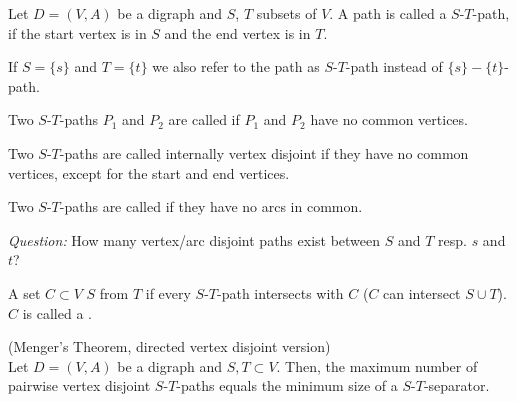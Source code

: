 \begin{lec}[2011-12-01]\end{lec}



\begin{defn}
Let $D = (V, A)$ be a digraph and $S$, $T$ subsets of $V$.
A path is called a $S$-$T$-path, if the start vertex is in $S$ and the end
vertex is in $T$.

If $S = \{s\}$ and $T = \{t\}$ we also refer to the path as $S$-$T$-path
instead of $\{s\}-\{t\}$-path.
\end{defn}

\begin{defn}
Two $S$-$T$-paths $P_1$ and $P_2$ are called
 if $P_1$ and $P_2$ have no common
vertices.

Two $S$-$T$-paths are called internally vertex disjoint if they have no common
vertices, except for the start and end vertices.

Two $S$-$T$-paths are called  if they have no
arcs in common.
\end{defn}
\emph{Question:} How many vertex/arc disjoint paths exist between $S$ and
$T$ resp. $s$ and $t$?

\begin{defn} 
A set $C \subset V$  $S$ from $T$ if every
$S$-$T$-path intersects with $C$ ($C$ can intersect $S \cup T$). $C$ is called
a . 
\end{defn}

\begin{thm}(Menger's Theorem, directed vertex disjoint version)\\
Let $D=(V,A)$ be a digraph and $S,T \subset V$. Then, the maximum number of
pairwise vertex disjoint $S$-$T$-paths equals the minimum size of a
$S$-$T$-separator.
\end{thm}

